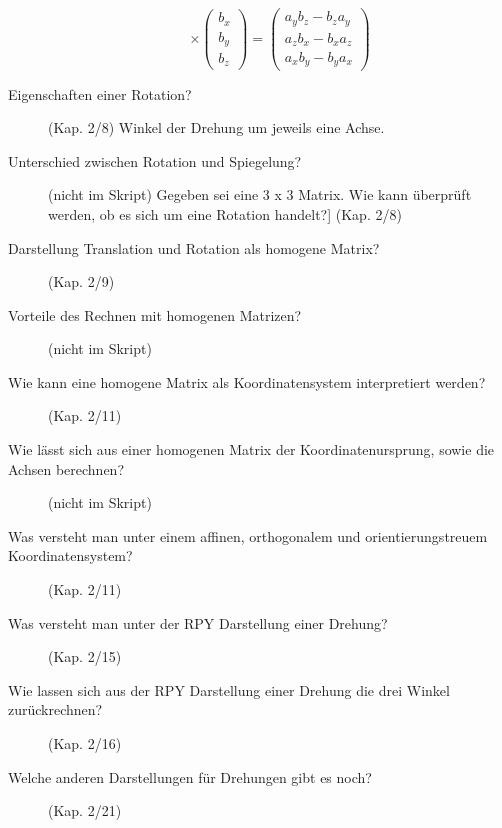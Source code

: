 \begin{description}
\begin{equation}
				\times
				\left(
					\begin{array}{c}
						b_{x} \\
						b_{y} \\
						b_{z}				
					\end{array}
				\right)
				= 
				\left(
					\begin{array}{c}
						a_{y}b_{z} - b_{z}a_{y} \\
						a_{z}b_{x} - b_{x}a_{z} \\
						a_{x}b_{y} - b_{y}a_{x}  
					\end{array}
				\right)				
		\end{equation}
	\item[Eigenschaften einer Rotation?] (Kap. 2/8)
		Winkel der Drehung um jeweils eine Achse.
	\item[Unterschied zwischen Rotation und Spiegelung?] (nicht im Skript)
Gegeben sei eine 3 x 3 Matrix. Wie kann überprüft werden, ob es sich um eine Rotation handelt?] (Kap. 2/8)
	\item[Darstellung Translation und Rotation als homogene Matrix?] (Kap. 2/9)
	\item[Vorteile des Rechnen mit homogenen Matrizen?] (nicht im Skript)
	\item[Wie kann eine homogene Matrix als Koordinatensystem interpretiert werden?] (Kap. 2/11)
	\item[Wie lässt sich aus einer homogenen Matrix der Koordinatenursprung, sowie die Achsen berechnen?] (nicht im Skript)
	\item[Was versteht man unter einem affinen, orthogonalem und orientierungstreuem Koordinatensystem?] (Kap. 2/11)
	\item[Was versteht man unter der RPY Darstellung einer Drehung?] (Kap. 2/15)
	\item[Wie lassen sich aus der RPY Darstellung einer Drehung die drei Winkel zurückrechnen?] (Kap. 2/16)
	\item[Welche anderen Darstellungen für Drehungen gibt es noch?] (Kap. 2/21)
\end{description}
